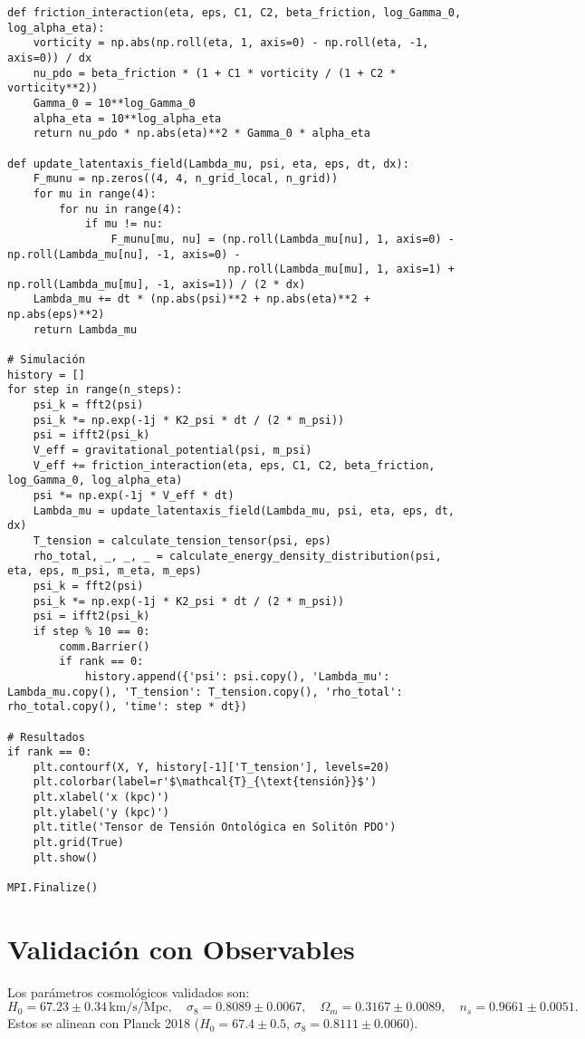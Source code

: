 \documentclass[a4paper,12pt]{article}
\begin{document}
\begin{verbatim}
def friction_interaction(eta, eps, C1, C2, beta_friction, log_Gamma_0, log_alpha_eta):
    vorticity = np.abs(np.roll(eta, 1, axis=0) - np.roll(eta, -1, axis=0)) / dx
    nu_pdo = beta_friction * (1 + C1 * vorticity / (1 + C2 * vorticity**2))
    Gamma_0 = 10**log_Gamma_0
    alpha_eta = 10**log_alpha_eta
    return nu_pdo * np.abs(eta)**2 * Gamma_0 * alpha_eta

def update_latentaxis_field(Lambda_mu, psi, eta, eps, dt, dx):
    F_munu = np.zeros((4, 4, n_grid_local, n_grid))
    for mu in range(4):
        for nu in range(4):
            if mu != nu:
                F_munu[mu, nu] = (np.roll(Lambda_mu[nu], 1, axis=0) - np.roll(Lambda_mu[nu], -1, axis=0) -
                                  np.roll(Lambda_mu[mu], 1, axis=1) + np.roll(Lambda_mu[mu], -1, axis=1)) / (2 * dx)
    Lambda_mu += dt * (np.abs(psi)**2 + np.abs(eta)**2 + np.abs(eps)**2)
    return Lambda_mu

# Simulación
history = []
for step in range(n_steps):
    psi_k = fft2(psi)
    psi_k *= np.exp(-1j * K2_psi * dt / (2 * m_psi))
    psi = ifft2(psi_k)
    V_eff = gravitational_potential(psi, m_psi)
    V_eff += friction_interaction(eta, eps, C1, C2, beta_friction, log_Gamma_0, log_alpha_eta)
    psi *= np.exp(-1j * V_eff * dt)
    Lambda_mu = update_latentaxis_field(Lambda_mu, psi, eta, eps, dt, dx)
    T_tension = calculate_tension_tensor(psi, eps)
    rho_total, _, _, _ = calculate_energy_density_distribution(psi, eta, eps, m_psi, m_eta, m_eps)
    psi_k = fft2(psi)
    psi_k *= np.exp(-1j * K2_psi * dt / (2 * m_psi))
    psi = ifft2(psi_k)
    if step % 10 == 0:
        comm.Barrier()
        if rank == 0:
            history.append({'psi': psi.copy(), 'Lambda_mu': Lambda_mu.copy(), 'T_tension': T_tension.copy(), 'rho_total': rho_total.copy(), 'time': step * dt})

# Resultados
if rank == 0:
    plt.contourf(X, Y, history[-1]['T_tension'], levels=20)
    plt.colorbar(label=r'$\mathcal{T}_{\text{tensión}}$')
    plt.xlabel('x (kpc)')
    plt.ylabel('y (kpc)')
    plt.title('Tensor de Tensión Ontológica en Solitón PDO')
    plt.grid(True)
    plt.show()

MPI.Finalize()
\end{verbatim}

\section{Validación con Observables}
Los parámetros cosmológicos validados son:
\[
H_0 = 67.23 \pm 0.34 \, \text{km/s/Mpc}, \quad \sigma_8 = 0.8089 \pm 0.0067, \quad \Omega_m = 0.3167 \pm 0.0089, \quad n_s = 0.9661 \pm 0.0051.
\]
Estos se alinean con Planck 2018 (\(H_0 = 67.4 \pm 0.5\), \(\sigma_8 = 0.8111 \pm 0.0060\)).
\end{document}
